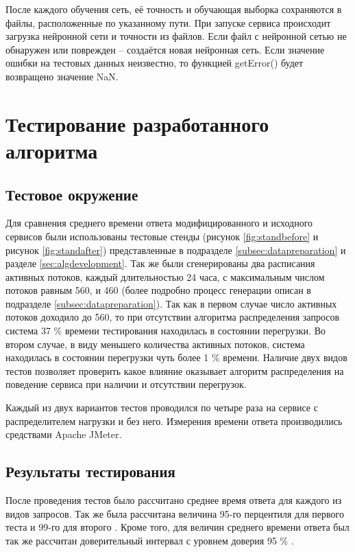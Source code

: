 \documentclass[a4paper,14pt,russian]{extreport}
\begin{document}
После каждого обучения сеть, её точность и обучающая выборка сохраняются в 
файлы, расположенные по указанному пути. При запуске сервиса происходит 
загрузка нейронной сети и точности из файлов. Если файл с нейронной сетью не 
обнаружен или поврежден -- создаётся новая нейронная сеть. Если значение 
ошибки на тестовых данных неизвестно, то функцией getError() будет 
возвращено значение NaN. 


\chapter{Тестирование разработанного алгоритма}
\section{Тестовое окружение}
Для сравнения среднего времени ответа модифицированного и исходного 
сервисов были использованы тестовые стенды (рисунок \ref{fig:standbefore} и 
рисунок \ref{fig:standafter}) представленные в подразделе 
\ref{subsec:datapreparation} и разделе \ref{sec:algdevelopment}. Так же были 
сгенерированы два расписания активных потоков, каждый длительностью 24 
часа, с максимальным числом потоков равным 560, и 460 (более подробно 
процесс генерации описан в подразделе \ref{subsec:datapreparation}). Так как в 
первом случае число активных потоков доходило до 560, то при отсутствии 
алгоритма распределения запросов система 37 \% времени тестирования 
находилась в состоянии перегрузки. Во втором случае, в виду меньшего 
количества активных потоков, система находилась в состоянии перегрузки чуть 
более 1 \% времени. Наличие двух видов тестов позволяет проверить какое 
влияние оказывает алгоритм распределения на поведение сервиса при наличии 
и отсутствии перегрузок.

Каждый из двух вариантов тестов проводился по четыре раза на сервисе с 
распределителем нагрузки и без него. Измерения времени ответа производились 
средствами Apache JMeter. 

\section{Результаты тестирования}
После проведения тестов было рассчитано среднее время ответа для каждого из 
видов запросов. Так же была рассчитана величина 95-го перцентиля для первого 
теста и 99-го для второго \cite{eliseeva2004}. Кроме того, для величин среднего 
времени ответа был так же рассчитан доверительный интервал с уровнем 
доверия 95 \%  \cite{eliseeva2004}.
\end{document}
